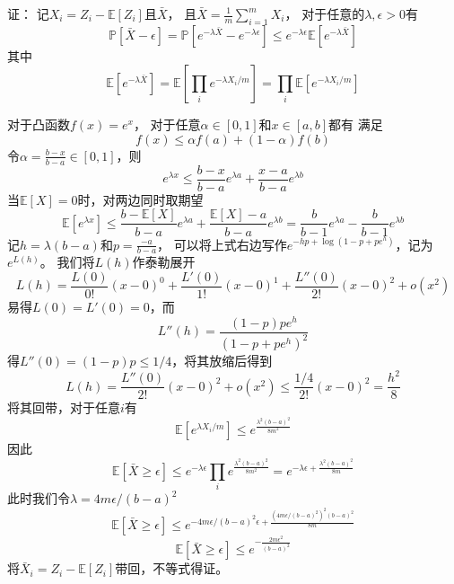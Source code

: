 \documentclass[UTF8]{ctexart}
\begin{document}
证：
记$X_i=Z_i-\mathbb{E}[Z_i]$且$\bar{X}$，
且$\bar{X}=\frac{1}{m}\sum^m_{i=1}X_i$，
对于任意的$\lambda, \epsilon > 0$有
$$
\mathbb{P}[\bar{X}-\epsilon]=
\mathbb{P}[e^{-\lambda\bar{X}}-e^{-\lambda\epsilon}]\leq
e^{-\lambda\epsilon}\mathbb{E}[e^{-\lambda\bar{X}}]
$$
其中
$$
\mathbb{E}[e^{-\lambda\bar{X}}]=
\mathbb{E}[\prod_i e^{-\lambda X_i/m}]=
\prod_i\mathbb{E}[e^{-\lambda X_i/m}]
$$

对于凸函数$f(x)=e^x$，
对于任意$\alpha \in [0,1]$和$x\in[a,b]$都有
满足
$$f(x)\leq \alpha f(a) + (1-\alpha) f(b)
$$
令$\alpha=\frac{b-x}{b-a}\in[0,1]$，则
$$
e^{\lambda x}\leq 
\frac{b-x}{b-a}e^{\lambda a}+\frac{x-a}{b-a}e^{\lambda b}
$$
当$\mathbb{E}[X]=0$时，对两边同时取期望
$$
\mathbb{E}[e^{\lambda x}]\leq
\frac{b-\mathbb{E}[X]}{b-a}e^{\lambda a}+\frac{\mathbb{E}[X]-a}{b-a}e^{\lambda b}=
\frac{b}{b-1}e^{\lambda a} - \frac{b}{b-1}e^{\lambda b} 
$$
记$h=\lambda(b-a)$和$p=\frac{-a}{b-a}$，
可以将上式右边写作$e^{-hp+\log(1-p+pe^h)}$，记为$e^{L(h)}$。
我们将$L(h)$作泰勒展开
$$
L(h)=\frac{L(0)}{0!}(x-0)^0+\frac{L'(0)}{1!}(x-0)^1+\frac{L''(0)}{2!}(x-0)^2+o(x^2)
$$
易得$L(0)=L'(0)=0$，而
$$
L''(h)=\frac{(1-p)pe^h}{(1-p+pe^h)^2}
$$
得$L''(0)=(1-p)p\leq 1/4$，将其放缩后得到
$$
L(h)=\frac{L''(0)}{2!}(x-0)^2+o(x^2)\leq
\frac{1/4}{2!}(x-0)^2=
\frac{h^2}{8}
$$
将其回带，对于任意$i$有
$$
\mathbb{E}[e^{\lambda X_i/m}]\leq e^{\frac{\lambda^2(b-a)^2}{8m^2}}
$$
因此
$$
\mathbb{E}[\bar{X}\geq \epsilon]\leq
e^{-\lambda\epsilon}\prod_ie^{\frac{\lambda^2(b-a)^2}{8m^2}}=
e^{-\lambda\epsilon+\frac{\lambda^2(b-a)^2}{8m}}
$$
此时我们令$\lambda=4m\epsilon/(b-a)^2$
$$
\mathbb{E}[\bar{X}\geq \epsilon]\leq
e^{-4m\epsilon/(b-a)^2\epsilon+\frac{(4m\epsilon/(b-a)^2)^2(b-a)^2}{8m}}
$$
$$
\mathbb{E}[\bar{X}\geq \epsilon]\leq
e^{-\frac{2m\epsilon^2}{(b-a)^2}}
$$
将$\bar{X}_i=Z_i-\mathbb{E}[Z_i]$带回，不等式得证。





%
\end{document}
